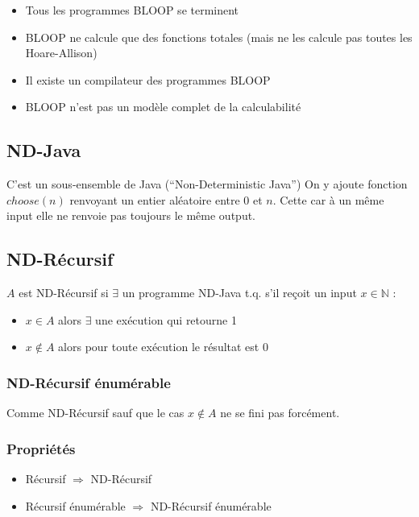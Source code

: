 \begin{itemize}
\item Tous les programmes BLOOP se terminent
\item BLOOP ne calcule que des fonctions totales (mais ne les calcule pas toutes les Hoare-Allison)
\item Il existe un compilateur des programmes BLOOP
\item BLOOP n'est pas un modèle complet de la calculabilité
\end{itemize}

\subsection{ND-Java}

C’est un sous-ensemble de Java (“Non-Deterministic Java”)
On y ajoute fonction $choose(n)$ renvoyant un entier aléatoire entre 0 et $n$. Cette  car à un même input elle ne renvoie pas toujours le même output.

\subsection{ND-Récursif}

$A$ est ND-Récursif si $\exists$ un programme ND-Java t.q. s'il reçoit un input $x \in \mathbb{N}$ :
\begin{itemize}
\item $x \in A$ alors $\exists$ une exécution qui retourne 1
\item $x \notin A$ alors pour toute exécution le résultat est 0
\end{itemize}

\subsubsection{ND-Récursif énumérable}

Comme ND-Récursif sauf que le cas $x \notin A$ ne se fini pas forcément.

\subsubsection{Propriétés}

\begin{itemize}
\item Récursif $\Rightarrow$ ND-Récursif
\item Récursif énumérable $\Rightarrow$ ND-Récursif énumérable
\end{itemize}

